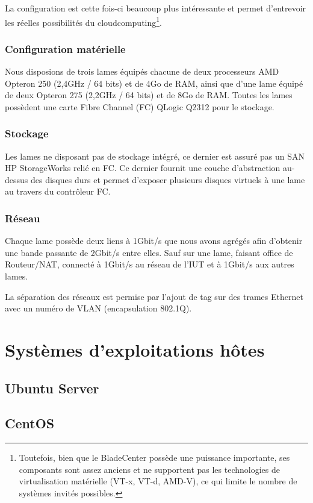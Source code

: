\documentclass[a4paper,oneside]{report}
\begin{document}
La configuration est cette fois-ci beaucoup plus intéressante et permet d'entrevoir les réelles possibilités du \gls{cloudcomputing}\footnote{Toutefois, bien que le BladeCenter possède une puissance importante, ses composants sont assez anciens et ne supportent pas les technologies de \gls{virtualisation} matérielle (VT-x, VT-d, AMD-V), ce qui limite le nombre de systèmes invités possibles.}.

\subsection{Configuration matérielle}
Nous disposions de trois lames équipés chacune de deux processeurs AMD Opteron 250 (2,4GHz / 64 bits) et de 4Go de RAM, ainsi que d'une lame équipé de deux Opteron 275 (2,2GHz / 64 bits) et de 8Go de RAM.\newline
Toutes les lames possèdent une carte Fibre Channel (FC) QLogic Q2312 pour le stockage.

\subsection{Stockage}
Les lames ne disposant pas de stockage intégré, ce dernier est assuré pas un SAN HP StorageWorks relié en FC.
Ce dernier fournit une couche d'abstraction au-dessus des disques durs et permet d'exposer plusieurs disques \og virtuels \fg à une lame au travers du contrôleur FC.

\subsection{Réseau}
Chaque lame possède deux liens à 1Gbit/s que nous avons agrégés afin d'obtenir une bande passante de 2Gbit/s entre elles.
Sauf sur une lame, faisant office de Routeur/NAT, connecté à 1Gbit/s au réseau de l'IUT et à 1Gbit/s aux autres lames.

La séparation des réseaux est permise par l'ajout de tag sur des trames Ethernet avec un numéro de VLAN (encapsulation 802.1Q).


\chapter{Systèmes d'exploitations hôtes}
\section{Ubuntu Server}

\section{CentOS}
\end{document}
